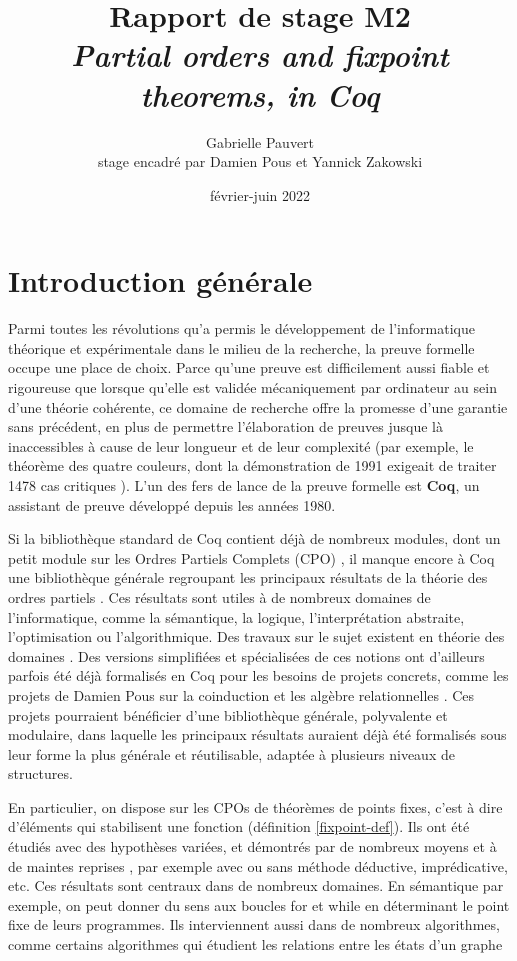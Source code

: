 \documentclass{article}
\title{Rapport de stage M2 \\
\textit{Partial orders and fixpoint theorems, in Coq}}
\date{février-juin 2022}
\author{Gabrielle Pauvert\\
stage encadré par Damien Pous et Yannick Zakowski}
\theoremstyle{definition}
\begin{document}
\maketitle

\section*{Introduction générale}

Parmi toutes les révolutions qu'a permis le développement de l'informatique théorique et expérimentale dans le milieu de la recherche, la preuve formelle occupe une place de choix. Parce qu'une preuve est difficilement aussi fiable et rigoureuse que lorsque qu'elle est validée mécaniquement par ordinateur au sein d'une théorie cohérente, ce domaine de recherche offre la promesse d'une garantie sans précédent, en plus de permettre l'élaboration de preuves jusque là inaccessibles à cause de leur longueur et de leur complexité (par exemple, le théorème des quatre couleurs, dont la démonstration de 1991 exigeait de traiter 1478 cas critiques \cite{4color}). L'un des fers de lance de la preuve formelle est \textbf{Coq}, un assistant de preuve développé depuis les années 1980.

Si la bibliothèque standard de Coq contient déjà de nombreux modules, dont un petit module sur les Ordres Partiels Complets (CPO) \cite{coqCPO}, il manque encore à Coq une bibliothèque générale regroupant les principaux résultats de la théorie des ordres partiels \cite{main}. Ces résultats sont utiles à de nombreux domaines de l'informatique, comme la sémantique, la logique, l'interprétation abstraite, l'optimisation ou l'algorithmique. Des travaux sur le sujet existent en théorie des domaines \cite{dockins}. Des versions simplifiées et spécialisées de ces notions ont d'ailleurs parfois été déjà formalisés en Coq pour les besoins de projets concrets, comme les projets de Damien Pous sur la coinduction \cite{coind-theory} %
et les algèbre relationnelles \cite{relalg}. Ces projets pourraient bénéficier d'une bibliothèque générale, polyvalente et modulaire, dans laquelle les principaux résultats auraient déjà été formalisés sous leur forme la plus générale et réutilisable, adaptée à plusieurs niveaux de structures.


En particulier, on dispose sur les CPOs de théorèmes de points fixes, c'est à dire d'éléments qui stabilisent une fonction (définition \ref{fixpoint-def}). Ils ont été étudiés avec des hypothèses variées, et démontrés par de nombreux moyens et à de maintes reprises \cite{main} \cite{proofs} \cite{ktnote}, par exemple avec ou sans méthode déductive, imprédicative, etc. Ces résultats sont centraux dans de nombreux domaines. En sémantique par exemple, on peut donner du sens aux boucles for et while en déterminant le point fixe de leurs programmes. Ils interviennent aussi dans de nombreux algorithmes, comme certains algorithmes qui étudient les relations entre les états d'un graphe
\end{document}
